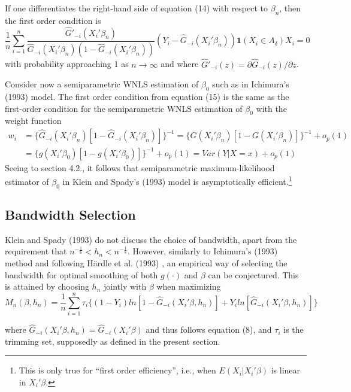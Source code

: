 \documentclass[a4paper]{article}
\begin{document}
If one differentiates the right-hand side of equation (14) with respect to $\beta_n$, then the first order condition is
\begin{equation}
\frac{1}{n} \sum_{i=1}^n \frac{\hat{G}'_{-i}(X_i'\beta_n)}{\hat{G}_{-i}(X_i'\beta_n)(1 - \hat{G}_{-i}(X_i'\beta_n))} (Y_i - \hat{G}_{-i}(X_i'\beta_n)) \mathbf{1}{(X_i \in A_\delta)} X_i = 0
\end{equation} 
with probability approaching 1 as $n \rightarrow \infty$ and where $\hat{G}'_{-i}(z) = \partial \hat{G}_{-i}(z) / \partial z$.

Consider now a semiparametric WNLS estimation of $\beta_0$ such as in Ichimura's (1993) \cite{[6]} model. The first order condition from equation (15) is the same as the first-order condition for the semiparametric WNLS estimation of $\beta_0$ with the weight function
\begin{align*}
w_i & = \{ \hat{G}_{-i}(X_i'\beta_n)[ 1 - \hat{G}_{-i}(X_i'\beta_n)]\}^{-1} = \{ G(X_i'\beta_n)[ 1 - G(X_i'\beta_n)]\}^{-1} + o_p(1) \\
     & = \{ g(X_i'\beta_0)[ 1 - g(X_i'\beta_0)]\}^{-1} + o_p(1) = Var(Y|X = x) + o_p(1)
\end{align*}
Seeing to section 4.2., it follows that semiparametric maximum-likelihood estimator of $\beta_0$ in Klein and Spady's (1993) \cite{[12]} model is asymptotically efficient.\footnote{This is only true for ``first order efficiency'', i.e., when $E(X_i|X_i'\beta)$ is linear in $X_i'\beta$.}

\subsection{Bandwidth Selection} %
\label{sub:Bandwidth Selection}

Klein and Spady (1993) \cite{[12]} do not discuss the choice of bandwidth, apart from the requirement that $ n^{-\frac{1}{6}} < h_n < n^{-\frac{1}{8}}$. However, similarly to Ichimura's (1993) \cite{[6]} method and following H{\"a}rdle et al. (1993) \cite{[18]}, an empirical way of selecting the bandwidth for optimal smoothing of both $g(\cdot)$ and $\beta$ can be conjectured. This is attained by choosing $h_n$ jointly with $\beta$ when maximizing
\begin{equation}
M_n(\beta, h_n) = \frac{1}{n}\sum_{i=1}^n \tau_{i}\{ (1 - Y_i)ln[ 1 - \hat{G}_{-i}(X_i'\beta, h_n)] +  Y_iln[\hat{G}_{-i}(X_i'\beta, h_n)]\}
\end{equation}

where $\hat{G}_{-i}(X_i'\beta, h_n) = \hat{G}_{-i}(X_i'\beta)$ and thus follows equation (8), and $\tau_i$ is the trimming set, supposedly as defined in the present section.
\end{document}
